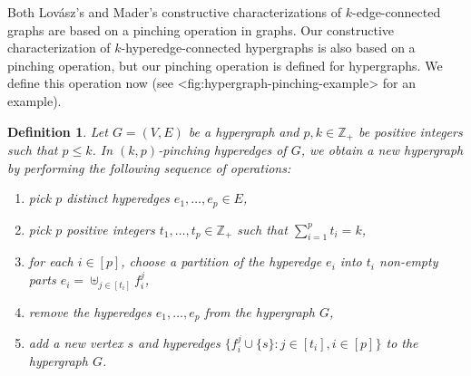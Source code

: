 \documentclass{article}
\def\Cref#1{<#1>}%
\newtheorem{definition}{Definition}[section]
\newcommand{\knote}[1]{{\color{red}[{\tiny Karthik: \bf #1}]\marginpar{\color{red}*}}}
\providecommand{\Z}{\mathbb{Z}}
\begin{document}
Both Lov\'{a}sz's and Mader's constructive characterizations of $k$-edge-connected graphs are based on a pinching operation in graphs. Our constructive characterization of $k$-hyperedge-connected hypergraphs is also based on a pinching operation, but our pinching operation is defined for hypergraphs. We define this operation now (see \Cref{fig:hypergraph-pinching-example} for an example). %

\begin{definition}\label{def:pinching-operation}
    Let $G = (V, E)$ be a hypergraph and $p,k \in \Z_+$ be positive integers such that $p \leq k$. In \emph{$(k, p)$-pinching} hyperedges of $G$, we obtain a new hypergraph by performing the following sequence of operations:
    \begin{enumerate}
        \item pick $p$ distinct hyperedges $e_1, \ldots, e_p \in E$,
        \item pick $p$ positive integers $t_1, \ldots, t_p \in \Z_+$ such that $\sum_{i=1}^p t_i = k$,
        \item for each $i \in [p]$, choose a partition of the hyperedge $e_i$ into $t_i$ non-empty parts $e_i = \uplus_{j \in [t_i]} f_i^j$,
        \item remove the hyperedges $e_1, \ldots, e_p$ from the hypergraph $G$,
        \item add a new vertex $s$ and hyperedges $\{f_i^j \cup \{s\} : j \in [t_i], i \in [p]\}$ to the hypergraph $G$.
    \end{enumerate}
\end{definition}
\end{document}
